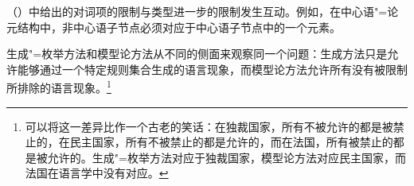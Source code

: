 
（）中给出的对词项的限制与类型进一步的限制发生互动。例如，在中心语"=论元结构中，非中心语子节点必须对应于中心语子节点\subcatlc 中的一个元素。

\addlines[-1]
生成"=枚举方法和模型论方法从不同的侧面来观察同一个问题：生成方法只是允许能够通过一个特定规则集合生成的语言现象，而模型论方法允许所有没有被限制所排除的语言现象。\footnote{%
可以将这一差异比作一个古老的笑话：在独裁国家，所有不被允许的都是被禁止的，在民主国家，所有不被禁止的都是允许的，而在法国，所有被禁止的都是被允许的。生成"=枚举方法对应于独裁国家，模型论方法对应民主国家，而法国在语言学中没有对应。
}

